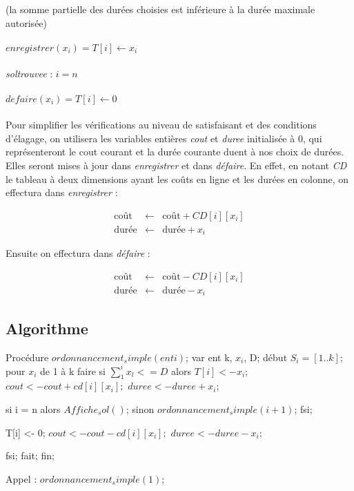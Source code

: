 \documentclass[a4paper, titlepage]{article}
\begin{document}
	(la somme partielle des durées choisies est inférieure à la durée maximale autorisée)

	\paragraph{}\noindent
	$enregistrer(x_{i}) = T[i] \leftarrow x_{i}$

	\paragraph{}\noindent
	\emph{soltrouvee} : $i = n$

	\paragraph{}\noindent
	$defaire(x_{i}) = T[i] \leftarrow 0$

	\paragraph{}
	Pour simplifier les vérifications au niveau de satisfaisant et des conditions d'élagage, on utilisera les variables entières \emph{cout} et \emph{duree} initialisée à 0,
	qui représenteront le cout courant et la durée courante duent à nos choix de durées.
	Elles seront mises à jour dans \emph{enregistrer} et dans \emph{défaire}.
	En effet, en notant \emph{CD} le tableau à deux dimensions ayant les coûts en ligne et les durées en colonne, on effectura dans \emph{enregistrer} :

		\begin{eqnarray*}
			\mbox{coût}  & \leftarrow & \mbox{coût} + CD[i][x_{i}] \\
			\mbox{durée} & \leftarrow & \mbox{durée} + x_{i}
		\end{eqnarray*}

	Ensuite on effectura dans \emph{défaire} :

		\begin{eqnarray*}
			\mbox{coût}  & \leftarrow & \mbox{coût} - CD[i][x_{i}] \\
			\mbox{durée} & \leftarrow & \mbox{durée} - x_{i}
		\end{eqnarray*}

	\subsection{Algorithme}

Procédure $ordonnancement_simple(ent i)$;
var ent k, $x_{i}$, D;
début
	$S_{i} = [1..k];$
	pour $x_{i}$ de 1 à k faire
		si $\sum_{1}^{i} x_{l} <= D$ alors
			$T[i] <- x_{i};$
			$cout <- cout + cd[i][x_{i}];$
			$duree <- duree + x_{i};$

			si i = n alors $Affiche_sol()$;
			sinon
				$ordonnancement_simple(i+1)$;
			fsi;

		T[i] <- 0;
		$cout <- cout - cd[i][x_{i}];$
		$duree <- duree - x_{i};	$

		fsi;
	fait;
fin;

Appel : $ordonnancement_simple(1)$;
\end{document}
